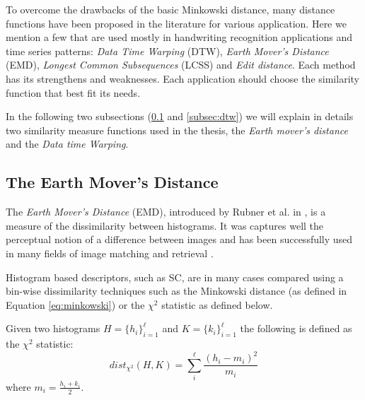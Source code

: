 \iftoggle{edit-mode}{\hspace{0pt}\marginpar{Advanced distance measure techniques}}{}
To overcome the drawbacks of the basic Minkowski distance, many distance functions have been proposed in the literature for various application. Here we mention a few that are used mostly in handwriting recognition applications and time series patterns: \emph{Data Time Warping} (DTW), \emph{Earth Mover's Distance} (EMD), \emph{Longest Common Subsequences} (LCSS) and \emph{Edit distance}. Each method has its strengthens and weaknesses. Each application should choose the similarity function that best fit its needs.

\iftoggle{edit-mode}{\hspace{0pt}\marginpar{Next Subsections}}{}
In the following two subsections (\ref{subsec:emd} and \ref{subsec:dtw}) we will explain in details two similarity measure functions used in the thesis, the \emph{Earth mover's distance} and the \emph{Data time Warping}. 

\subsection{The Earth Mover's Distance}
\label{subsec:emd}

\iftoggle{edit-mode}{\hspace{0pt}\marginpar{Introduction to EMD}}{}
The \emph{Earth Mover's Distance} (EMD), introduced by Rubner et al. in \cite{rubner2000earth}, is a measure of the dissimilarity between histograms. 
It was captures well the perceptual notion of a difference between images and has been successfully used in many fields of image matching and retrieval \cite{grauman2004fast, rubner2000earth}.

\iftoggle{edit-mode}{\hspace{0pt}\marginpar{Binwise based measures}}{}
Histogram based descriptors, such as SC, are in many cases compared using a bin-wise dissimilarity techniques such as the Minkowski distance (as defined in Equation \ref{eq:minkowski}) or the $\chi^2$ statistic as defined below.
 
\begin{definition}
Given two histograms $H=\{h_i\}_{i=1}^{\ell}$ and $K=\{k_i\}_{i=1}^{\ell}$ the following is defined as the $\chi^2$ statistic: 
\begin{equation}
dist_{\chi^2}(H,K)=\sum_{i}^{\ell} \frac{(h_i - m_i)^2}{m_i}
\end{equation}
where $m_i=\frac{h_i+k_i}{2}$.
\end{definition}

